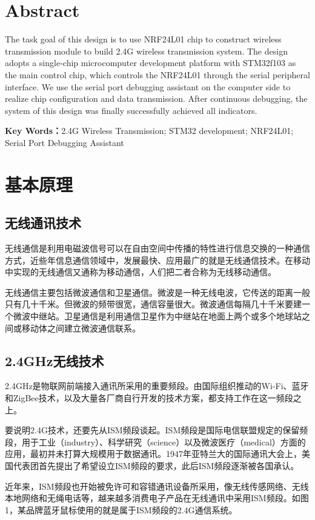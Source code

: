 \documentclass[UTF8,a4paper,11pt]{article}
\begin{document}
\section*{Abstract}
The task goal of this design is to use NRF24L01 chip to construct wireless transmission module to build  2.4G wireless transmission system. The design adopts a single-chip microcomputer development platform with STM32f103 as the main control chip, which controls the NRF24L01 through the serial peripheral interface. We use the serial port debugging assistant on the computer side to realize chip configuration and data transmission. After continuous debugging, the system of this design was finally successfully achieved all indicators.

{\large\textbf{Key Words：}}2.4G Wireless Transmission; STM32 development; NRF24L01; Serial Port Debugging Assistant
\clearpage

\section{基本原理}
\subsection{无线通讯技术}
无线通信是利用电磁波信号可以在自由空间中传播的特性进行信息交换的一种通信方式，近些年信息通信领域中，发展最快、应用最广的就是无线通信技术。在移动中实现的无线通信又通称为移动通信，人们把二者合称为无线移动通信。

无线通信主要包括微波通信和卫星通信。微波是一种无线电波，它传送的距离一般只有几十千米。但微波的频带很宽，通信容量很大。微波通信每隔几十千米要建一个微波中继站。卫星通信是利用通信卫星作为中继站在地面上两个或多个地球站之间或移动体之间建立微波通信联系。
 
\subsection{2.4GHz无线技术}
2.4GHz是物联网前端接入通讯所采用的重要频段。由国际组织推动的Wi-Fi、蓝牙和ZigBee技术，以及大量各厂商自行开发的技术方案，都支持工作在这一频段之上。

要说明2.4G技术，还要先从ISM频段谈起。ISM频段是国际电信联盟规定的保留频段，用于工业（industry）、科学研究（science）以及微波医疗（medical）方面的应用，最初并未打算大规模用于数据通讯。1947年亚特兰大的国际通讯大会上，美国代表团首先提出了希望设立ISM频段的要求，此后ISM频段逐渐被各国承认。

近年来，ISM频段也开始被免许可和容错通讯设备所采用，像无线传感网络、无线本地网络和无绳电话等，越来越多消费电子产品在无线通讯中采用ISM频段。如图1，某品牌蓝牙鼠标使用的就是属于ISM频段的2.4G通信系统。
\end{document}
